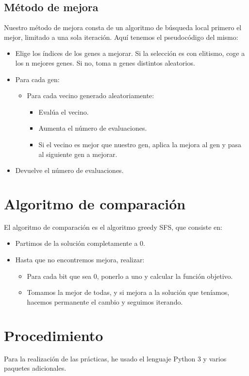 \subsection{Método de mejora}
Nuestro método de mejora consta de un algoritmo de búsqueda local primero el mejor, limitado a una sola iteración. Aquí tenemos el pseudocódigo del mismo:\\
 
\begin{itemize}
\item Elige los índices de los genes a mejorar. Si la selección es con elitismo, coge a los n mejores genes. Si no, toma n genes distintos aleatorios.
\item Para cada gen:
\begin{itemize}
\item Para cada vecino generado aleatoriamente:
\begin{itemize}
\item Evalúa el vecino.
\item Aumenta el número de evaluaciones.
\item Si el vecino es mejor que nuestro gen, aplica la mejora al gen y pasa al siguiente gen a mejorar.
\end{itemize}
\end{itemize}
\item Devuelve el número de evaluaciones.
\end{itemize}

\newpage
\section{Algoritmo de comparación}
El algoritmo de comparación es el algoritmo greedy SFS, que consiste en:
\begin{itemize}
\item Partimos de la solución completamente a 0.
\item Hasta que no encontremos mejora, realizar:
\begin{itemize}
\item Para cada bit que sea 0, ponerlo a uno y calcular la función objetivo.
\item Tomamos la mejor de todas, y si mejora a la solución que teníamos, hacemos permanente el cambio y seguimos iterando.
\end{itemize} 
\end{itemize} 
\newpage
\section{Procedimiento}
Para la realización de las prácticas, he usado el lenguaje Python 3 y varios paquetes adicionales.\\


